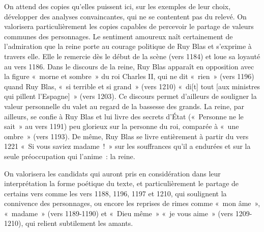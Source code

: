 {On attend des copies qu'elles puissent ici, sur les exemples de leur choix,
développer des analyses convaincantes, qui ne se contentent pas du relevé. On
valorisera particulièrement les copies capables de percevoir le partage de valeurs
communes des personnages. Le sentiment amoureux naît certainement de
l'admiration que la reine porte au courage politique de Ruy Blas et s'exprime à travers
elle. Elle le remercie dès le début de la scène (vers 1184) et loue sa loyauté au vers
1186. Dans le discours de la reine, Ruy Blas apparaît en opposition avec la figure
«~morne et sombre~» du roi Charles II, qui ne dit «~rien~» (vers 1196) quand Ruy Blas,
«~si terrible et si grand~» (vers 1210) «~di[t] tout [aux ministres qui pillent l'Espagne]~»
(vers 1203). Ce discours permet d'ailleurs de souligner la valeur personnelle du valet
au regard de la bassesse des grands. La reine, par ailleurs, se confie à Ruy Blas et lui
livre des secrets d'État («~Personne ne le sait~» au vers 1191) peu glorieux sur la
personne du roi, comparée à «~une ombre~» (vers 1193). De même, Ruy Blas se livre
entièrement à partir du vers 1221 «~Si vous saviez madame~!~» sur les souffrances qu'il
a endurées et sur la seule préoccupation qui l'anime~: la reine.

On valorisera les candidats qui auront pris en considération dans leur
interprétation la forme poétique du texte, et particulièrement le partage de certains vers
comme les vers 1188, 1196, 1197 et 1210, qui soulignent la connivence des
personnages, ou encore les reprises de rimes comme «~mon âme~», «~madame~»
(vers 1189-1190) et «~Dieu même~» «~je vous aime~» (vers 1209-1210), qui relient
subtilement les amants.}%
